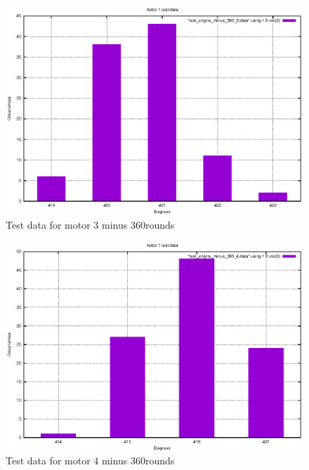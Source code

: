 \begin{figure}[ht]
  \includegraphics{graphics/test_graphs/test_engine_minus_360_3.eps}
  \caption{Test data for motor 3 minus 360\textdegree rounds}
  \centering
  \label{fig:td_m3_minus}
\end{figure}

\begin{figure}[ht]
  \includegraphics{graphics/test_graphs/test_engine_minus_360_4.eps}
  \caption{Test data for motor 4 minus 360\textdegree rounds}
  \centering
  \label{fig:td_m4_minus}
\end{figure}


